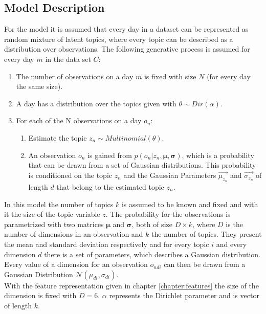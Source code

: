 \subsection{Model Description}
  
  For the model it is assumed that every day in a dataset can be represented as random mixture of latent topics, where every topic can be described as a distribution over observations. The following generative process is assumed for every day $m$ in the data set $C$:
\begin{enumerate}
 \item The number of observations on a day $m$ is fixed with size $N$ (for every day the same size).
 \item A day has a distribution over the topics given with $\theta \sim Dir(\alpha)$.
 \item For each of the N observations on a day $o_n$:
 
 \begin{enumerate}
  \item Estimate the topic $z_n \sim Multinomial(\theta)$.
  \item An observation $o_n$ is gained from $p(o_n |z_n,\boldsymbol\mu,\boldsymbol\sigma)$,  which is a probability that can be drawn from a set of Gaussian distributions. This probability is conditioned on the topic $z_n$ and the Gaussian Parameters $\vec{\mu_{z_n}}$ and $\vec{\sigma_{z_n}}$ of length $d$ that belong to the estimated topic $z_n$.
 \end{enumerate}

\end{enumerate}
  
In this model the number of topics $k$ is assumed to be known and fixed and with it the size of the topic variable $z$.
The probability for the observations is parametrized with two matrices $\boldsymbol\mu$ and $\boldsymbol\sigma$, both of size $D\times k$, where $D$ is the number of dimensions in an observation and $k$ the number of topics. They present the mean and standard deviation respectively and for every topic $i$ and every dimension $d$ there is a set of parameters, which describes a Gaussian distribution. Every value of a dimension for an observation $o_{ndi}$ can then be drawn from a Gaussian Distribution $\mathcal{N}(\mu_{di},\sigma_{di})$.\\
With the feature representation given in chapter \ref{chapter:features} the size of the dimension is fixed with $D=6$. $\alpha$ represents the Dirichlet parameter and is vector of length $k$.

